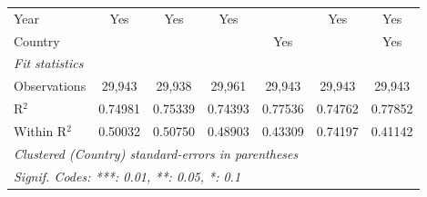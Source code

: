 \begin{tabular}{lcccccc}
   Year                                        & Yes            & Yes             & Yes            &                & Yes             & Yes\\  
   Country                                     &                &                 &                & Yes            &                 & Yes\\  
   \midrule
   \emph{Fit statistics}\\
   Observations                                & 29,943         & 29,938          & 29,961         & 29,943         & 29,943          & 29,943\\  
   R$^2$                                       & 0.74981        & 0.75339         & 0.74393        & 0.77536        & 0.74762         & 0.77852\\  
   Within R$^2$                                & 0.50032        & 0.50750         & 0.48903        & 0.43309        & 0.74197         & 0.41142\\  
   \midrule \midrule
   \multicolumn{7}{l}{\emph{Clustered (Country) standard-errors in parentheses}}\\
   \multicolumn{7}{l}{\emph{Signif. Codes: ***: 0.01, **: 0.05, *: 0.1}}\\
\end{tabular}
\par\endgroup


